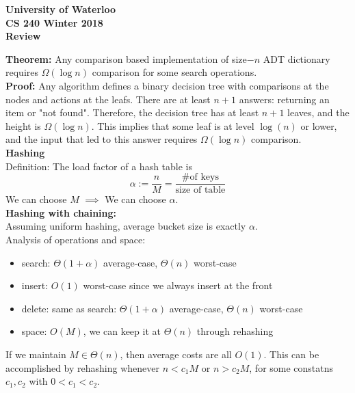 \documentclass[12pt]{article}
\begin{document}
\begin{center}
	{\Large\bf University of Waterloo}\\
	\vspace{3mm}
	{\Large\bf CS 240 Winter 2018}\\
	\vspace{3mm}
	{\Large\bf Review}\\	
\end{center}

{\parindent0pt

\textbf{Theorem: }Any comparison based implementation of size$-n$ ADT dictionary requires $\Omega(\log n)$ comparison for some search operations. \\
\textbf{Proof:} Any algorithm defines a binary decision tree with comparisons at the nodes and actions at the leafs. There are at least $n+1$ answers: returning an item or "not found". Therefore, the decision tree has at least $n+1$ leaves, and the height is $\Omega(\log n)$. This implies that some leaf is at level $\log(n)$ or lower, and the input that led to this answer requires $\Omega(\log n)$ comparison. \\


{\Large\bf Hashing}\\


Definition: The load factor of a hash table is 
\[\alpha := \frac{n}{M} = \frac{\text{\# of keys}}{\text{size of table}} \]
We can choose $M$ $\implies $ We can choose $\alpha$. \\


\textbf{Hashing with chaining:}\\
Assuming uniform hashing, average bucket size is exactly $\alpha$. \\
Analysis of operations and space:
\begin{itemize}
	\renewcommand\labelitemi{--}
	\item search: $\Theta(1+\alpha)$ average-case, $\Theta(n)$ worst-case
	\item insert: $O(1)$ worst-case since we always insert at the front
	\item delete: same as search: $\Theta(1+\alpha)$ average-case, $\Theta(n)$ worst-case
	\item space: $O(M)$, we can keep it at $\Theta(n)$ through rehashing
\end{itemize}
If we maintain $M \in \Theta(n)$, then average costs are all $O(1)$. This can be accomplished by rehashing whenever $n < c_1M $ or $n > c_2M$, for some constatns $c_1, c_2$ with $0< c_1 < c_2$. \\


}
\end{document}

